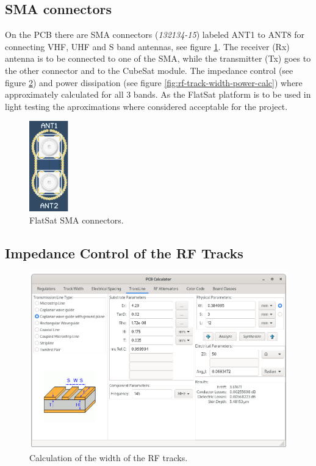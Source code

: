 \subsection{SMA connectors}

On the PCB there are SMA connectors (\textit{132134-15}) labeled ANT1 to ANT8 for connecting VHF, UHF and S band antennas, see figure \ref{fig:antennas-smas}. The receiver (Rx) antenna is to be connected to one of the SMA, while the transmitter (Tx) goes to the other connector and to the CubeSat module. The impedance control (see figure \ref{fig:rf-track-width-calc}) and power dissipation (see figure \ref{fig:rf-track-width-power-calc}) where approximately calculated for all 3 bands. As the FlatSat platform is to be used in light testing the aproximations where considered acceptable for the project.

\begin{figure}[!ht]
    \begin{center}
        \includegraphics[width=0.15\textwidth]{figures/antennas_smas.png}
        \caption{FlatSat SMA connectors.}
        \label{fig:antennas-smas}
    \end{center}
\end{figure}

\subsection{Impedance Control of the RF Tracks}

\begin{figure}[!ht]
    \begin{center}
        \includegraphics[width=\textwidth]{figures/rf-track-width.png}
        \caption{Calculation of the width of the RF tracks.}
        \label{fig:rf-track-width-calc}
    \end{center}
\end{figure}

